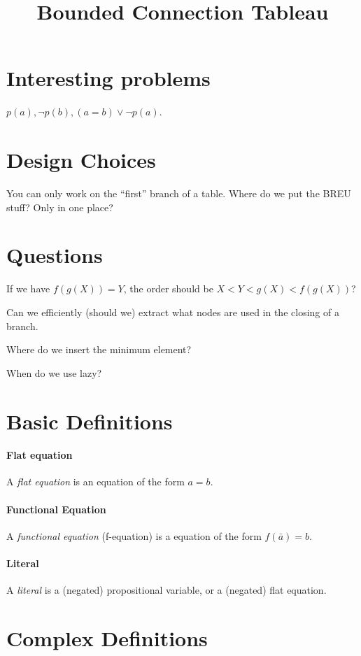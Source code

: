 \documentclass{article}
\title{Bounded Connection Tableau}
\begin{document}
\maketitle
\section{Interesting problems}
$p(a), \neg p(b), (a = b) \vee \neg p(a)$.

\section{Design Choices}
You can only work on the ``first'' branch of a table.
Where do we put the BREU stuff? Only in one place?

\section{Questions}
If we have $f(g(X)) = Y$, the order should be $X < Y < g(X) < f(g(X))$?

Can we efficiently (should we) extract what nodes are used in the closing of a branch.

Where do we insert the minimum element?

When do we use lazy?

\section{Basic Definitions}

\paragraph{Flat equation} A \emph{flat equation} is an equation of the form $a = b$.

\paragraph{Functional Equation} A \emph{functional equation} (f-equation) is a equation of the form $f(\bar{a}) = b$.

\paragraph{Literal} A \emph{literal} is a (negated) propositional variable, or a (negated) flat equation.

\section{Complex Definitions}
\end{document}

